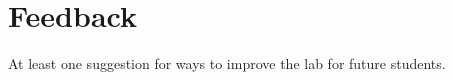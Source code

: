 \section{Feedback}\label{sec:feedback}
At least one suggestion for ways to improve the lab for future students.
